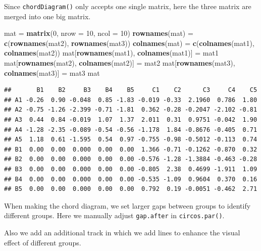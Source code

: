 \documentclass[]{book}
\newenvironment{Shaded}{\begin{snugshade}}{\end{snugshade}}
\newcommand{\KeywordTok}[1]{\textcolor[rgb]{0.13,0.29,0.53}{\textbf{#1}}}
\newcommand{\DataTypeTok}[1]{\textcolor[rgb]{0.13,0.29,0.53}{#1}}
\newcommand{\DecValTok}[1]{\textcolor[rgb]{0.00,0.00,0.81}{#1}}
\newcommand{\StringTok}[1]{\textcolor[rgb]{0.31,0.60,0.02}{#1}}
\newcommand{\NormalTok}[1]{#1}
\theoremstyle{definition}
\theoremstyle{definition}
\theoremstyle{remark}
\begin{document}
Since \texttt{chordDiagram()} only accepts one single matrix, here the
three matrix are merged into one big matrix.

\begin{Shaded}
\begin{Highlighting}[]
\NormalTok{mat =}\StringTok{ }\KeywordTok{matrix}\NormalTok{(}\DecValTok{0}\NormalTok{, }\DataTypeTok{nrow =} \DecValTok{10}\NormalTok{, }\DataTypeTok{ncol =} \DecValTok{10}\NormalTok{)}
\KeywordTok{rownames}\NormalTok{(mat) =}\StringTok{ }\KeywordTok{c}\NormalTok{(}\KeywordTok{rownames}\NormalTok{(mat2), }\KeywordTok{rownames}\NormalTok{(mat3))}
\KeywordTok{colnames}\NormalTok{(mat) =}\StringTok{ }\KeywordTok{c}\NormalTok{(}\KeywordTok{colnames}\NormalTok{(mat1), }\KeywordTok{colnames}\NormalTok{(mat2))}
\NormalTok{mat[}\KeywordTok{rownames}\NormalTok{(mat1), }\KeywordTok{colnames}\NormalTok{(mat1)] =}\StringTok{ }\NormalTok{mat1}
\NormalTok{mat[}\KeywordTok{rownames}\NormalTok{(mat2), }\KeywordTok{colnames}\NormalTok{(mat2)] =}\StringTok{ }\NormalTok{mat2}
\NormalTok{mat[}\KeywordTok{rownames}\NormalTok{(mat3), }\KeywordTok{colnames}\NormalTok{(mat3)] =}\StringTok{ }\NormalTok{mat3}
\NormalTok{mat}
\end{Highlighting}
\end{Shaded}

\begin{verbatim}
##       B1    B2     B3    B4    B5     C1    C2      C3     C4    C5
## A1 -0.26  0.90 -0.048  0.85 -1.83 -0.019 -0.33  2.1960  0.786  1.80
## A2 -0.75 -1.26 -2.399 -0.71 -1.81  0.362 -0.28 -0.2047 -2.102 -0.81
## A3  0.44  0.84 -0.019  1.07  1.37  2.011  0.31  0.9751 -0.042  1.90
## A4 -1.28 -2.35 -0.089 -0.54 -0.56 -1.178  1.84 -0.8676 -0.405  0.71
## A5  1.18  0.61 -1.595  0.54  0.97 -0.755 -0.98 -0.5012 -0.113  0.74
## B1  0.00  0.00  0.000  0.00  0.00  1.366 -0.71 -0.1262 -0.870  0.32
## B2  0.00  0.00  0.000  0.00  0.00 -0.576 -1.28 -1.3884 -0.463 -0.28
## B3  0.00  0.00  0.000  0.00  0.00 -0.805  2.38  0.4699 -1.911  1.09
## B4  0.00  0.00  0.000  0.00  0.00 -0.535 -1.09  0.9604  0.370  0.16
## B5  0.00  0.00  0.000  0.00  0.00  0.792  0.19 -0.0051 -0.462  2.71
\end{verbatim}

When making the chord diagram, we set larger gaps between groups to
identify different groups. Here we manually adjust \texttt{gap.after} in
\texttt{circos.par()}.

Also we add an additional track in which we add lines to enhance the
visual effect of different groups.
\end{document}
